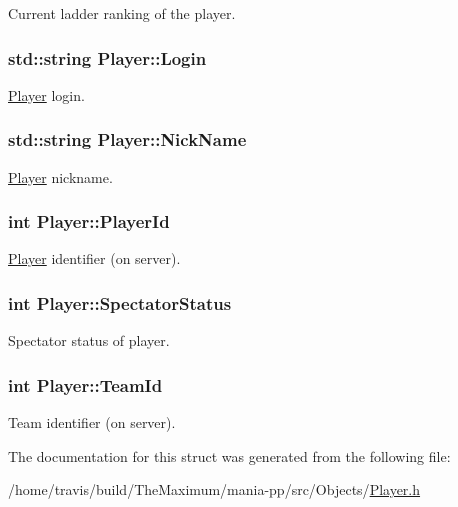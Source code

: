 Current ladder ranking of the player. 

\hypertarget{structPlayer_a38398818d43e186aa982a788744792d7}{
\subsubsection[{Login}]{\setlength{\rightskip}{0pt plus 5cm}std\-::string Player\-::\-Login}}\label{structPlayer_a38398818d43e186aa982a788744792d7}


\hyperlink{structPlayer}{Player} login. 

\hypertarget{structPlayer_a553cc1b0aa79108b511ba408210582cf}{
\subsubsection[{Nick\-Name}]{\setlength{\rightskip}{0pt plus 5cm}std\-::string Player\-::\-Nick\-Name}}\label{structPlayer_a553cc1b0aa79108b511ba408210582cf}


\hyperlink{structPlayer}{Player} nickname. 

\hypertarget{structPlayer_a6a71d7d9837a0a12e52ca47930965e0f}{
\subsubsection[{Player\-Id}]{\setlength{\rightskip}{0pt plus 5cm}int Player\-::\-Player\-Id}}\label{structPlayer_a6a71d7d9837a0a12e52ca47930965e0f}


\hyperlink{structPlayer}{Player} identifier (on server). 

\hypertarget{structPlayer_a2037601661fb699454a88b5649485b30}{
\subsubsection[{Spectator\-Status}]{\setlength{\rightskip}{0pt plus 5cm}int Player\-::\-Spectator\-Status}}\label{structPlayer_a2037601661fb699454a88b5649485b30}


Spectator status of player. 

\hypertarget{structPlayer_a350919664ba73d6d6cd6d03bd2a5cacd}{
\subsubsection[{Team\-Id}]{\setlength{\rightskip}{0pt plus 5cm}int Player\-::\-Team\-Id}}\label{structPlayer_a350919664ba73d6d6cd6d03bd2a5cacd}


Team identifier (on server). 



The documentation for this struct was generated from the following file\-:\begin{DoxyCompactItemize}
\item 
/home/travis/build/\-The\-Maximum/mania-\/pp/src/\-Objects/\hyperlink{Player_8h}{Player.\-h}\end{DoxyCompactItemize}
